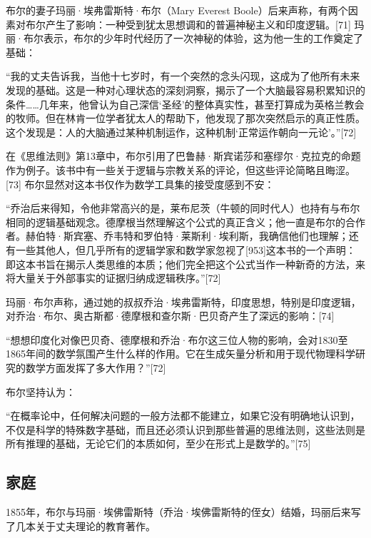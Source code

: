 布尔的妻子玛丽·埃弗雷斯特·布尔（Mary Everest Boole）后来声称，有两个因素对布尔产生了影响：一种受到犹太思想调和的普遍神秘主义和印度逻辑。[71] 玛丽·布尔表示，布尔的少年时代经历了一次神秘的体验，这为他一生的工作奠定了基础：

“我的丈夫告诉我，当他十七岁时，有一个突然的念头闪现，这成为了他所有未来发现的基础。这是一种对心理状态的深刻洞察，揭示了一个大脑最容易积累知识的条件……几年来，他曾认为自己深信‘圣经’的整体真实性，甚至打算成为英格兰教会的牧师。但在林肯一位学者犹太人的帮助下，他发现了那次突然启示的真正性质。这个发现是：人的大脑通过某种机制运作，这种机制‘正常运作朝向一元论’。”[72]

在《思维法则》第13章中，布尔引用了巴鲁赫·斯宾诺莎和塞缪尔·克拉克的命题作为例子。该书中有一些关于逻辑与宗教关系的评论，但这些评论简略且晦涩。[73] 布尔显然对这本书仅作为数学工具集的接受度感到不安：

“乔治后来得知，令他非常高兴的是，莱布尼茨（牛顿的同时代人）也持有与布尔相同的逻辑基础观念。德摩根当然理解这个公式的真正含义；他一直是布尔的合作者。赫伯特·斯宾塞、乔韦特和罗伯特·莱斯利·埃利斯，我确信他们也理解；还有一些其他人，但几乎所有的逻辑学家和数学家忽视了[953]这本书的一个声明：即这本书旨在揭示人类思维的本质；他们完全把这个公式当作一种新奇的方法，来将大量关于外部事实的证据归纳成逻辑秩序。”[72]

玛丽·布尔声称，通过她的叔叔乔治·埃弗雷斯特，印度思想，特别是印度逻辑，对乔治·布尔、奥古斯都·德摩根和查尔斯·巴贝奇产生了深远的影响：[74]

“想想印度化对像巴贝奇、德摩根和乔治·布尔这三位人物的影响，会对1830至1865年间的数学氛围产生什么样的作用。它在生成矢量分析和用于现代物理科学研究的数学方面发挥了多大作用？”[72]

布尔坚持认为：

“在概率论中，任何解决问题的一般方法都不能建立，如果它没有明确地认识到，不仅是科学的特殊数字基础，而且还必须认识到那些普遍的思维法则，这些法则是所有推理的基础，无论它们的本质如何，至少在形式上是数学的。”[75]
\subsection{家庭}  
1855年，布尔与玛丽·埃佛雷斯特（乔治·埃佛雷斯特的侄女）结婚，玛丽后来写了几本关于丈夫理论的教育著作。

